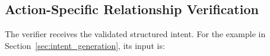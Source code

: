 


\subsection{Action-Specific Relationship Verification}

The verifier receives the validated structured intent. For the example in
Section~\ref{sec:intent_generation}, its input is:

